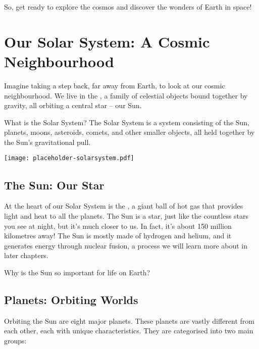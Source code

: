 So, get ready to explore the cosmos and discover the wonders of Earth in space!

\section{Our Solar System: A Cosmic Neighbourhood}

Imagine taking a step back, far away from Earth, to look at our cosmic neighbourhood. We live in the , a family of celestial objects bound together by gravity, all orbiting a central star – our Sun.

\begin{keyconcept}{What is the Solar System?}
The Solar System is a system consisting of the Sun, planets, moons, asteroids, comets, and other smaller objects, all held together by the Sun’s gravitational pull.
\end{keyconcept}

\begin{marginfigure}
\texttt{[image: placeholder-solarsystem.pdf]}
\caption{\label{fig:solarsystem}A simplified model of our Solar System. \textit{Image to be added.}}
\end{marginfigure}

\subsection{The Sun: Our Star}

At the heart of our Solar System is the , a giant ball of hot gas that provides light and heat to all the planets.  The Sun is a star, just like the countless stars you see at night, but it's much closer to us. In fact, it’s about 150 million kilometres away!  The Sun is mostly made of hydrogen and helium, and it generates energy through nuclear fusion, a process we will learn more about in later chapters.

\begin{stopandthink}
Why is the Sun so important for life on Earth?
\end{stopandthink}

\subsection{Planets: Orbiting Worlds}

Orbiting the Sun are eight major planets.  These planets are vastly different from each other, each with unique characteristics.  They are categorised into two main groups:

